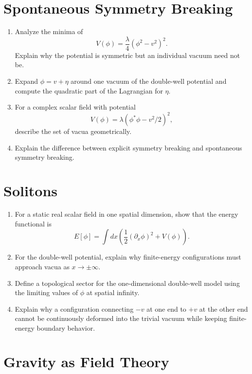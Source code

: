 \section{Spontaneous Symmetry Breaking}

\begin{enumerate}
    \item Analyze the minima of
    \[
        V(\phi)=\frac{\lambda}{4}(\phi^2-v^2)^2.
    \]
    Explain why the potential is symmetric but an individual vacuum need not be.

    \item Expand \(\phi=v+\eta\) around one vacuum of the double-well potential
    and compute the quadratic part of the Lagrangian for \(\eta\).

    \item For a complex scalar field with potential
    \[
        V(\phi)=\lambda(\phi^*\phi-v^2/2)^2,
    \]
    describe the set of vacua geometrically.

    \item Explain the difference between explicit symmetry breaking and
    spontaneous symmetry breaking.
\end{enumerate}

\section{Solitons}

\begin{enumerate}
    \item For a static real scalar field in one spatial dimension, show that the
    energy functional is
    \[
        E[\phi]=\int dx\left(\frac{1}{2}(\partial_x\phi)^2+V(\phi)\right).
    \]

    \item For the double-well potential, explain why finite-energy configurations
    must approach vacua as \(x\to\pm\infty\).

    \item Define a topological sector for the one-dimensional double-well model
    using the limiting values of \(\phi\) at spatial infinity.

    \item Explain why a configuration connecting \(-v\) at one end to \(+v\) at
    the other end cannot be continuously deformed into the trivial vacuum while
    keeping finite-energy boundary behavior.
\end{enumerate}

\section{Gravity as Field Theory}

